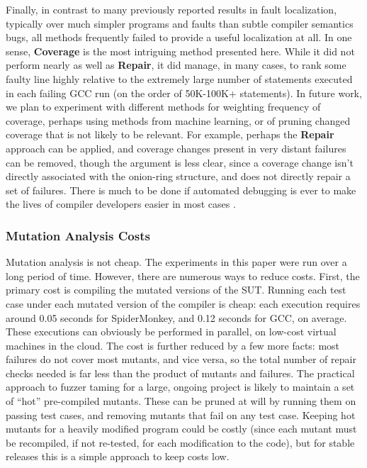 Finally, in contrast to many previously reported results in fault localization, typically over much simpler programs and faults than subtle compiler semantics bugs, all methods frequently failed to provide a useful localization at all.  In one sense, {\bf Coverage} is the most intriguing method presented here.  While it did not perform nearly as well as {\bf Repair}, it did manage, in many cases, to rank some faulty line highly relative to the extremely large number of statements executed in each failing GCC run (on the order of 50K-100K+ statements).  In future work, we plan to experiment with different methods for weighting frequency of coverage, perhaps using methods from machine learning, or of pruning changed coverage that is not likely to be relevant.  For example, perhaps the {\bf Repair} approach can be applied, and coverage changes present in very distant failures can be removed, though the argument is less clear, since a coverage change isn't directly associated with the onion-ring structure, and does not directly repair a set of failures.  There is much to be done if automated debugging is ever to make the lives of compiler developers easier in most cases \cite{AutoHelp}.  

\subsubsection{Mutation Analysis Costs}

Mutation analysis is not cheap.  The experiments in this paper were run over a long period of time.  However, there are numerous ways to reduce costs.  First, the primary cost is compiling the mutated versions of the SUT.  Running each test case under each mutated version of the compiler is cheap: each execution requires around 0.05 seconds for SpiderMonkey, and 0.12 seconds for GCC, on average.  These executions can obviously be performed in parallel, on low-cost virtual machines in the cloud.  The cost is further reduced by a few more facts: most failures do not cover most mutants, and vice versa, so the total number of repair checks needed is far less than the product of mutants and failures.  The practical approach to fuzzer taming for a large, ongoing project is likely to maintain a set of ``hot'' pre-compiled mutants.  These can be pruned at will by running them on passing test cases, and removing mutants that fail on any test case.  Keeping hot mutants for a heavily modified program could be costly (since each mutant must be recompiled, if not re-tested, for each modification to the code), but for stable releases this is a simple approach to keep costs low.

